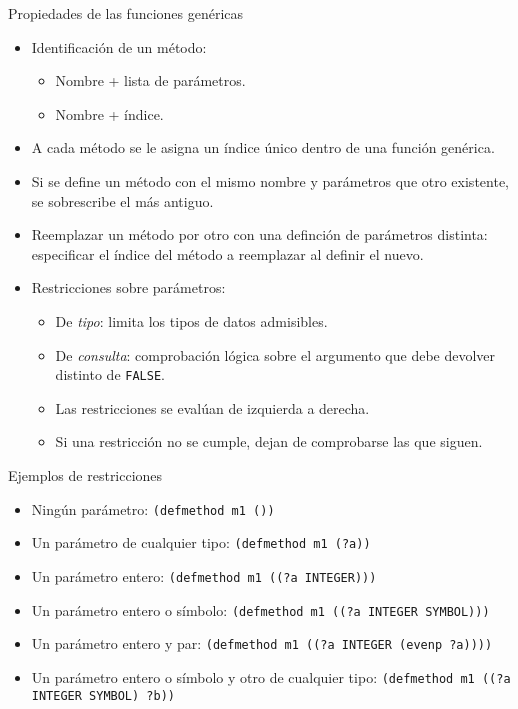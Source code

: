 \documentclass[usenames,dvipsnames,aspectratio=169]{beamer}
\begin{document}
\begin{frame}{Propiedades de las funciones genéricas}
	\begin{itemize}
		\item Identificación de un método:
		\begin{itemize}
			\item Nombre + lista de parámetros.
			\item Nombre + índice.
		\end{itemize}
		\item A cada método se le asigna un índice único dentro de una función genérica.
		\item Si se define un método con el mismo nombre y parámetros que otro existente, se sobrescribe el más antiguo.
		\item Reemplazar un método por otro con una definción de parámetros distinta: especificar el índice del método a reemplazar al definir el nuevo.
		\item Restricciones sobre parámetros:
		\begin{itemize}
			\item De \textit{tipo}: limita los tipos de datos admisibles.
			\item De \textit{consulta}: comprobación lógica sobre el argumento que debe devolver distinto de \texttt{FALSE}.
			\item Las restricciones se evalúan de izquierda a derecha.
			\item Si una restricción no se cumple, dejan de comprobarse las que siguen.
		\end{itemize}
	\end{itemize}
\end{frame}

\begin{frame}{Ejemplos de restricciones}
	\begin{itemize}
		\item Ningún parámetro: \texttt{(defmethod m1 ())}
		\item Un parámetro de cualquier tipo: \texttt{(defmethod m1 (?a))}
		\item Un parámetro entero: \texttt{(defmethod m1 ((?a INTEGER)))}
		\item Un parámetro entero o símbolo: \texttt{(defmethod m1 ((?a INTEGER SYMBOL)))}
		\item Un parámetro entero y par: \texttt{(defmethod m1 ((?a INTEGER (evenp ?a))))}
		\item Un parámetro entero o símbolo y otro de cualquier tipo: \texttt{(defmethod m1 ((?a INTEGER SYMBOL) ?b))}
	\end{itemize}
\end{frame}
\end{document}
